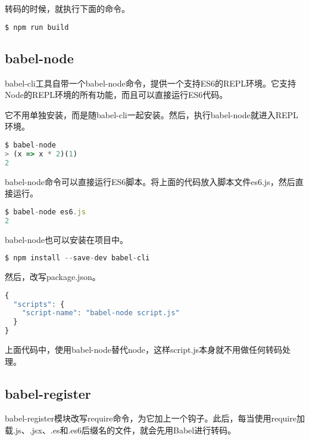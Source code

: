转码的时候，就执行下面的命令。





\begin{lstlisting}[language=JavaScript]
$ npm run build
\end{lstlisting}


\subsection{babel-node}



babel-cli工具自带一个babel-node命令，提供一个支持ES6的REPL环境。它支持Node的REPL环境的所有功能，而且可以直接运行ES6代码。

它不用单独安装，而是随babel-cli一起安装。然后，执行babel-node就进入REPL环境。




\begin{lstlisting}[language=JavaScript]
$ babel-node
> (x => x * 2)(1)
2
\end{lstlisting}

babel-node命令可以直接运行ES6脚本。将上面的代码放入脚本文件es6.js，然后直接运行。


\begin{lstlisting}[language=JavaScript]
$ babel-node es6.js
2
\end{lstlisting}



babel-node也可以安装在项目中。

\begin{lstlisting}[language=JavaScript]
$ npm install --save-dev babel-cli
\end{lstlisting}


然后，改写package.json。



\begin{lstlisting}[language=JavaScript]
{
  "scripts": {
    "script-name": "babel-node script.js"
  }
}
\end{lstlisting}

上面代码中，使用babel-node替代node，这样script.js本身就不用做任何转码处理。

\subsection{babel-register}

babel-register模块改写require命令，为它加上一个钩子。此后，每当使用require加载.js、.jsx、.es和.es6后缀名的文件，就会先用Babel进行转码。



